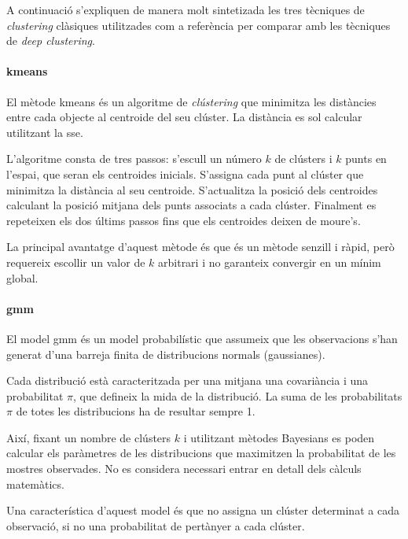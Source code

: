 \documentclass[CAT,BIB]{TFUOC}%
\begin{document}
    A continuació s'expliquen de manera molt sintetizada
    les tres tècniques de \textit{clustering} clàsiques utilitzades com a referència
    per comparar amb les tècniques de \textit{deep clustering}.

    \paragraph{\Gls{kmeans}}
        El mètode \gls{kmeans}
        és un algoritme de \textit{clústering}
        que minimitza les distàncies entre cada objecte
        al centroide del seu clúster.
        La distància es sol calcular utilitzant la \gls{sse}.

        L'algoritme consta de tres passos:
        s'escull un número $k$ de clústers
        i $k$ punts en l'espai,
        que seran els centroides inicials.
        S'assigna cada punt al clúster que minimitza la distància al seu centroide.
        S'actualitza la posició dels centroides
        calculant la posició mitjana dels punts associats a cada clúster.
        Finalment es repeteixen els dos últims passos
        fins que els centroides deixen de moure's.

        La principal avantatge d'aquest mètode és que és un mètode senzill i ràpid,
        però requereix escollir un valor de $k$ arbitrari
        i no garanteix convergir en un mínim global.

    \paragraph{\Gls{gmm}}
        El model \gls{gmm}
        és un model probabilístic que assumeix que les observacions
        s'han generat d'una barreja finita de distribucions normals (gaussianes).

        Cada distribució està caracteritzada per una mitjana
        una covariància i una probabilitat $\pi$,
        que defineix la mida de la distribució.
        La suma de les probabilitats $\pi$ de totes les distribucions
        ha de resultar sempre 1.

        Així, fixant un nombre de clústers $k$
        i utilitzant mètodes Bayesians
        es poden calcular els paràmetres de les distribucions
        que maximitzen la probabilitat de les mostres observades.
        No es considera necessari entrar en detall dels càlculs matemàtics.

        Una característica d'aquest model
        és que no assigna un clúster determinat a cada observació,
        si no una probabilitat de pertànyer a cada clúster.
\end{document}
